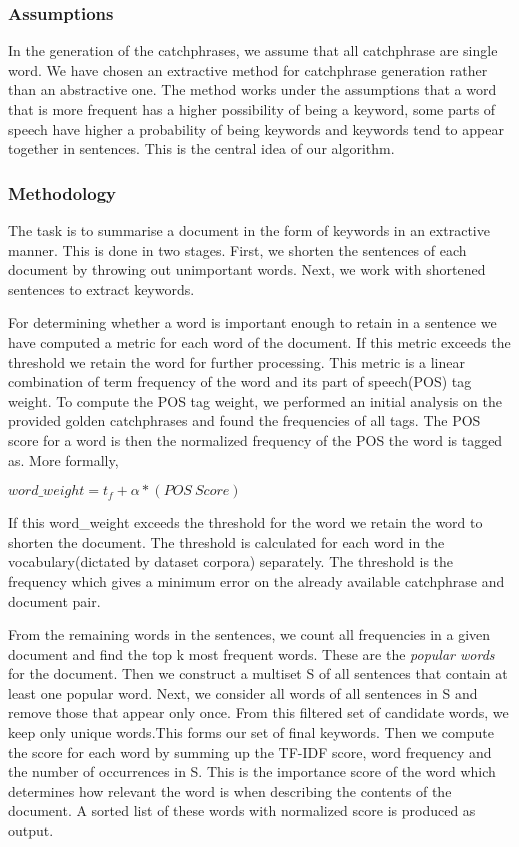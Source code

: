 \subsubsection{Assumptions}
In the generation of the catchphrases, we assume that all catchphrase are single word. We have chosen an extractive method for catchphrase generation rather than an abstractive one. The method works under the assumptions that a word that is more frequent has a higher possibility of being a keyword, some parts of speech have higher a probability of being keywords and keywords tend to appear together in sentences. This is the central idea of our algorithm.
\subsubsection{Methodology}
The task is to summarise a document in the form of keywords in an extractive manner. This is done in two stages. First, we shorten the sentences of each document by throwing out unimportant words. Next, we work with shortened sentences to extract keywords. 


For determining whether a word is important enough to retain in a sentence we have computed a metric for each word of the document. If this metric exceeds the threshold we retain the word for further processing. This metric is a linear combination of term frequency of the word and its part of speech(POS) tag weight. To compute the POS tag weight, we performed an initial analysis on the provided golden catchphrases and found the frequencies of all tags. The POS score for a word is then the normalized frequency of the POS the word is tagged as. More formally, 


\(word\_weight = t_f + \alpha * (POS\ Score)\)


If this word\_weight exceeds the threshold for the word we retain the word to shorten the document. The threshold is calculated for each word in the vocabulary(dictated by dataset corpora) separately. The threshold is the frequency which gives a minimum error on the already available catchphrase and document pair. 


From the remaining words in the sentences, we count all frequencies in a given document and find the top k most frequent words. These are the \textit{popular words} for the document. Then we construct a multiset S of all sentences that contain at least one popular word. Next, we consider all words of all sentences in S and remove those that appear only once. From this filtered set of candidate words, we keep only unique words.This forms our set of final keywords. Then we compute the score for each word by summing up the TF-IDF score, word frequency and the number of occurrences in S. This is the importance score of the word which determines how relevant the word is when describing the contents of the document. A sorted list of these words with normalized score is produced as output.
